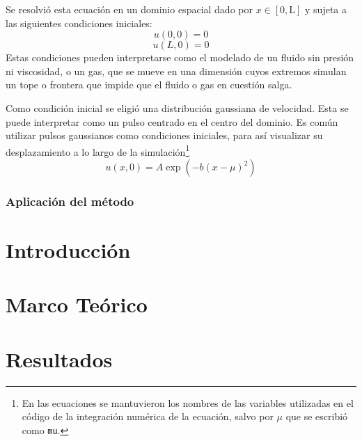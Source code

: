 \documentclass[12pt]{article}
\newcommand{\m}{\text{m}}
\begin{document}
	Se resolvió esta ecuación en un dominio espacial dado por $x \in [0,\text{L}]$ y sujeta a las siguientes condiciones iniciales:\\
	\begin{equation}
		u(0,0)=0
	\end{equation}
	\begin{equation}
		u(L,0)= 0
	\end{equation}
	Estas condiciones pueden interpretarse como el modelado de un fluido sin presión ni viscosidad, o un gas, que se mueve en una dimensión cuyos extremos simulan un tope o frontera que impide que el fluido o gas en cuestión salga. %
	
	Como condición inicial se eligió una distribución gaussiana de velocidad. Esta se puede interpretar como un pulso centrado en el centro del dominio. Es común utilizar pulsos gaussianos como condiciones iniciales, para así visualizar su desplazamiento a lo largo de la simulación\footnote{En las ecuaciones se mantuvieron los nombres de las variables utilizadas en el código de la integración numérica de la ecuación, salvo por $\mu$ que se escribió como \texttt{mu}.}
	\begin{equation}
		u(x,0) = A\exp(-b(x-\mu)^{2})
	\end{equation}
	
	\subsubsection*{Aplicación del método}

	
	\clearpage
	\section{Introducción}
	\section{Marco Teórico}
	\section{Resultados}
	
\end{document}
